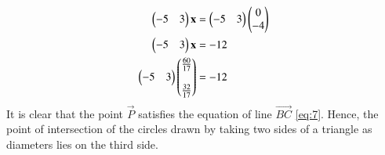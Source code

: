 \documentclass[journal,12pt,twocolumn]{IEEEtran}
\begin{document}
\begin{enumerate}
\begin{align}
\end{align}
\begin{align}
\begin{pmatrix}-5&3\end{pmatrix}\mathbf{x} &= \begin{pmatrix}-5&3\end{pmatrix}\begin{pmatrix}0\\-4\end{pmatrix}\\
\begin{pmatrix}-5&3\end{pmatrix}\mathbf{x} &= -12
\label{eq:7}\\
\begin{pmatrix}-5&3\end{pmatrix}\begin{pmatrix}\frac{60}{17}\\\\\frac{32}{17}\end{pmatrix} &= -12
\end{align}
It is clear that the point $\vec{P}$ satisfies the equation of line $\vec{BC}$ \eqref{eq:7}. Hence, the point of intersection of the circles drawn by taking two sides of a triangle as diameters lies on the third side.
\end{enumerate}
\end{document}
